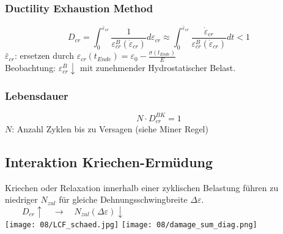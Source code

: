         \subsubsection{Ductility Exhaustion Method}
            \[D_{cr}=\int_0^{\bar{\varepsilon}_{cr}}\frac{1}{\varepsilon_{cr}^B(\dot{\varepsilon}_{cr})}d\varepsilon_{cr} \approx \int_0^{\bar{\varepsilon}_{cr}}\frac{\dot{\varepsilon}_{cr}}{\varepsilon_{cr}^B(\dot{\varepsilon}_{cr})}dt< 1\]
            $\bar{\varepsilon}_{cr}$: ersetzen durch $\varepsilon_{cr}(t_{Ende})=\varepsilon_0-\frac{\sigma(t_{Ende})}{E}$
            \\Beobachtung: $\varepsilon_{cr}^{B}\downarrow$ mit zunehmender Hydrostatischer Belast.
        \subsubsection{Lebensdauer}
            \[N\cdot D_{cr}^{BK} = 1\]
            $N$: Anzahl Zyklen bis zu Versagen (siehe Miner Regel)
    \subsection{Interaktion Kriechen-Ermüdung}
        Kriechen oder Relaxation innerhalb einer zyklischen Belastung führen zu niedriger $N_{zul}$ für gleiche Dehnungsschwingbreite $\Delta\varepsilon$. $\qquad D_{cr}\uparrow \quad\rightarrow\quad N_{zul}(\Delta\varepsilon)\downarrow$\\
            \texttt{[image: 08/LCF\_schaed.jpg]}
            \texttt{[image: 08/damage\_sum\_diag.png]}
        